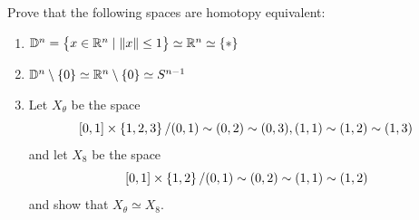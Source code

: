 \documentclass[11pt,a4paper]{article}
\begin{document}
\begin{exercise}
  Prove that the following spaces are homotopy equivalent:
  \begin{enumerate}
    \item[(1)] $\mathbb{D}^n = \left\{x \in \mathbb{R}^n \mid \left\lVert x\right\rVert \le 1\right\} \simeq
      \mathbb{R}^n \simeq \left\{*\right\}$
    \item[(2)] $\mathbb{D}^n \setminus \left\{0\right\} \simeq
      \mathbb{R}^n \setminus \left\{0\right\} \simeq S^{n-1}$
    \item[(3)] Let $X_{\theta}$ be the space
      \[
        [0,1] \times \left\{1,2,3\right\} /
        (0,1) \sim (0,2) \sim (0,3),
        (1,1) \sim (1,2) \sim (1,3)
      \]
      and let $X_8$ be the space
      \[
        [0,1] \times \left\{1,2\right\} /
        (0,1) \sim (0,2) \sim (1,1) \sim (1,2)
      \]
      and show that $X_{\theta} \simeq X_8$.
  \end{enumerate}
\end{exercise}
\end{document}
